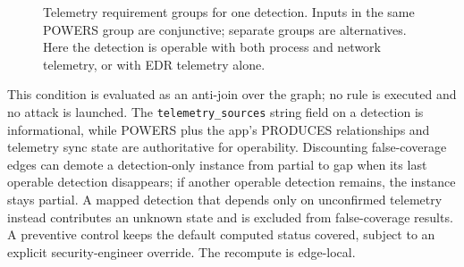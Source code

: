 \documentclass[10pt]{article}
\newcommand{\code}[1]{\texttt{#1}}
\begin{document}
\begin{figure}[H]
\centering
{}
\caption{Telemetry requirement groups for one detection. Inputs in the same POWERS group are conjunctive; separate groups are alternatives. Here the detection is operable with both process and network telemetry, or with EDR telemetry alone.}
\label{fig:reqgroups}
\end{figure}

This condition is evaluated as an anti-join over the graph; no rule is executed and no attack is launched. The \code{telemetry\_sources} string field on a detection is informational, while POWERS plus the app's PRODUCES relationships and telemetry sync state are authoritative for operability. Discounting false-coverage edges can demote a detection-only instance from partial to gap when its last operable detection disappears; if another operable detection remains, the instance stays partial. A mapped detection that depends only on unconfirmed telemetry instead contributes an unknown state and is excluded from false-coverage results. A preventive control keeps the default computed status covered, subject to an explicit security-engineer override. The recompute is edge-local.
\end{document}
